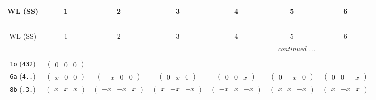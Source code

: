 \documentclass[fleqn,9pt,landscape]{jsarticle}
\begin{document}
\begin{center}
\renewcommand{\arraystretch}{1.2}
\begin{longtable}{ccccccc}
 \hline \hline
WL (SS) & 1 & 2 & 3 & 4 & 5 & 6 \\ \hline \endfirsthead

\multicolumn{6}{l}{\tablename\ \thetable{}} \\
 \hline \hline
WL (SS) & 1 & 2 & 3 & 4 & 5 & 6 \\ \hline \endhead

 \hline \hline
\multicolumn{6}{r}{\footnotesize\it continued ...} \\ \endfoot

 \hline \hline
\multicolumn{6}{r}{} \\ \endlastfoot

{\tt 1o} ({\tt 432}) & $ \begin{pmatrix} 0 & 0 & 0 \end{pmatrix} $ & $  $ & $  $ & $  $ & $  $ & $  $ \\ \hline
{\tt 6a} ({\tt 4..}) & $ \begin{pmatrix} x & 0 & 0 \end{pmatrix} $ & $ \begin{pmatrix} - x & 0 & 0 \end{pmatrix} $ & $ \begin{pmatrix} 0 & x & 0 \end{pmatrix} $ & $ \begin{pmatrix} 0 & 0 & x \end{pmatrix} $ & $ \begin{pmatrix} 0 & - x & 0 \end{pmatrix} $ & $ \begin{pmatrix} 0 & 0 & - x \end{pmatrix} $ \\ \hline
{\tt 8b} ({\tt .3.}) & $ \begin{pmatrix} x & x & x \end{pmatrix} $ & $ \begin{pmatrix} - x & - x & x \end{pmatrix} $ & $ \begin{pmatrix} x & - x & - x \end{pmatrix} $ & $ \begin{pmatrix} - x & x & - x \end{pmatrix} $ & $ \begin{pmatrix} x & x & - x \end{pmatrix} $ & $ \begin{pmatrix} x & - x & x \end{pmatrix} $ \\

\end{longtable}
\end{center}
\end{document}
